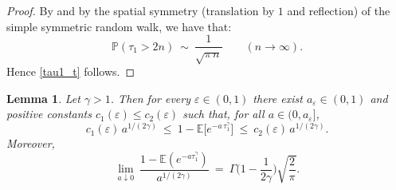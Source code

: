 \documentclass[preprint]{imsart}
\newcommand{\PP}{\mathbb{P}}
\newcommand{\EE}{\mathbb{E}}
\newcommand{\1}{\mathbf{1}}
\theoremstyle{plain}
\newtheorem{lemma}[theorem]{Lemma}
\theoremstyle{definition}
\begin{document}
\begin{proof}
By \cite[Prop.~5.1.2]{LawlerLimic2010} and by the spatial symmetry (translation by $1$ and reflection) of the simple symmetric random walk, we have that:
\[
\PP(\tau_1>2n)\ \sim\ \frac{1}{\sqrt{\pi\,n}}
\qquad (n\to\infty).
\]
Hence \eqref{tau1_t} follows.
\end{proof}







\begin{lemma}\label{lem:tauber-Tgamma-EN-eps}
Let $\gamma>1$. Then for every $\varepsilon\in(0,1)$ there exist $a_\varepsilon\in(0,1)$ and positive constants $c_1(\varepsilon)\le c_2(\varepsilon)$ such that, for all $a\in(0,a_\varepsilon]$,
\begin{equation}\label{eq:Lap-two-sided-EN-eps}
c_1(\varepsilon)\,a^{1/(2\gamma)}\ \le\ 1-\EE\!\big[e^{-a\,\tau_1^\gamma}\big]\ \le\ c_2(\varepsilon)\,a^{1/(2\gamma)}.
\end{equation}
Moreover,
\begin{equation}\label{eq:Lap-limit-EN-eps}
\lim_{a\downarrow 0}\ \frac{1-\EE(e^{-a \tau_1^\gamma})}{a^{1/(2\gamma)}}\ =\ \Gamma\!\Big(1-\frac{1}{2\gamma}\Big)\sqrt{\frac{2}{\pi}}.
\end{equation}
\end{lemma}
\end{document}
